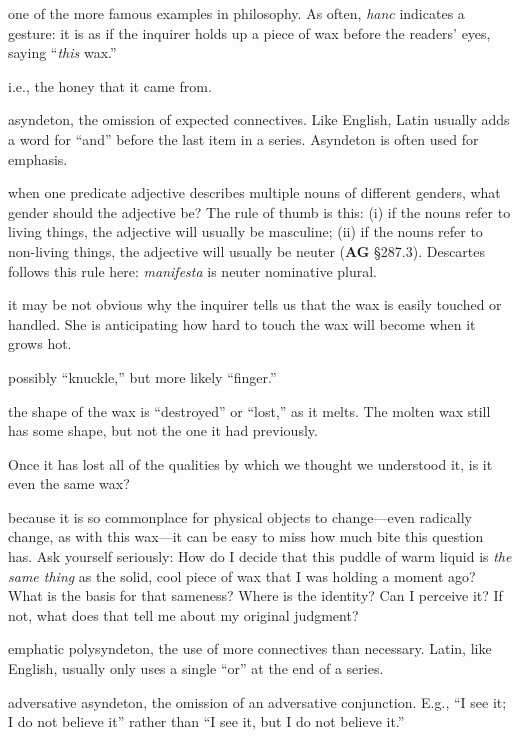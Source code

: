  one of the more famous examples in philosophy. As often, \textit{hanc} indicates a gesture: it is as if the inquirer holds up a piece of wax before the readers' eyes, saying ``\textit{this} wax.''

 i.e., the honey that it came from.

 asyndeton, the omission of expected connectives. Like English, Latin usually adds a word for ``and'' before the last item in a series. Asyndeton is often used for emphasis.

 when one predicate adjective describes multiple nouns of different genders, what gender should the adjective be? The rule of thumb is this: (i) if the nouns refer to living things, the adjective will usually be masculine; (ii) if the nouns refer to non-living things, the adjective will usually be neuter (\textbf{AG} §287.3). Descartes follows this rule here: \textit{manifesta} is neuter nominative plural.

 it may be not obvious why the inquirer tells us that the wax is easily touched or handled. She is anticipating how hard to touch the wax will become when it grows hot.

 possibly ``knuckle,'' but more likely ``finger.''

 the shape of the wax is ``destroyed'' or ``lost,'' as it melts. The molten wax still has some shape, but not the one it had previously.

 Once it has lost all of the qualities by which we thought we understood it, is it even the same wax?

 because it is so commonplace for physical objects to change---even radically change, as with this wax---it can be easy to miss how much bite this question has. Ask yourself seriously: How do I decide that this puddle of warm liquid is \textit{the same thing} as the solid, cool piece of wax that I was holding a moment ago? What is the basis for that sameness? Where is the identity? Can I perceive it? If not, what does that tell me about my original judgment?

 emphatic polysyndeton, the use of more connectives than necessary. Latin, like English, usually only uses a single ``or'' at the end of a series.

 adversative asyndeton, the omission of an adversative conjunction. E.g., ``I see it; I do not believe it'' rather than ``I see it, but I do not believe it.''

